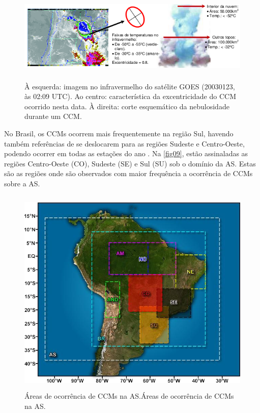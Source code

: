 \begin{figure}
\centering
\includegraphics[height=4.5cm]{./figs/fig08.png}
\caption{À esquerda: imagem no infravermelho do satélite GOES (20030123, às 02:09 UTC). Ao centro: característica da excentricidade do CCM ocorrido nesta data. À direita: corte esquemático da nebulosidade durante um CCM.}
\label{fig08}
\end{figure}

No Brasil, os CCMs ocorrem mais frequentemente na região Sul, havendo também referências de se deslocarem para as regiões Sudeste e Centro-Oeste, podendo ocorrer em todas as estações do ano \cite{silvadias96}. Na \autoref{fig09}, estão assinaladas as regiões Centro-Oeste (CO), Sudeste (SE) e Sul (SU) sob o domínio da AS. Estas são as regiões onde são observados com maior frequência a ocorrência de CCMs sobre a AS.

\begin{figure}
\centering
\includegraphics[height=10cm]{./figs/fig09.png}
\caption{Áreas de ocorrência de CCMs na AS.Áreas de ocorrência de CCMs na AS.}
\label{fig09}
\end{figure}

